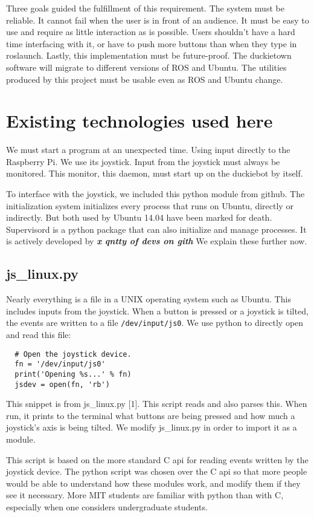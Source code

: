 \documentclass[titlepage]{article}
\begin{document}
Three goals guided the fulfillment of this requirement. The system must be reliable. It cannot fail when the user is in front of an audience. It must be easy to use and require as little interaction as is possible. Users shouldn't have a hard time interfacing with it, or have to push more buttons than when they type in roslaunch.
Lastly, this implementation must be future-proof. The duckietown software will migrate to  different versions of ROS and Ubuntu. The utilities produced by this project must be usable even as ROS and Ubuntu change. 
\section{Existing technologies used here} 
We must start a program at an unexpected time. Using input directly to the Raspberry Pi. We use its joystick. Input from the joystick must always be monitored. This monitor, this daemon, must start up on the duckiebot by itself. 

To interface with the joystick, we included this python module from github. 
The initialization system initializes every process that runs on Ubuntu, directly or indirectly. But both used by Ubuntu 14.04 have been marked for death.
Supervisord is a python package that can also initialize and manage processes. It is actively developed by \textbf{\textit{x qntty of devs on gith}}
We explain these further now. 
\subsection{js\_linux.py}
Nearly everything is a file in a UNIX operating system such as Ubuntu. This includes inputs from the joystick. When a button is pressed or a joystick is tilted, the events are written to a file \texttt{/dev/input/js0}. We use python to directly open and read this file:

\begin{lstlisting}
  # Open the joystick device.
  fn = '/dev/input/js0' 
  print('Opening %s...' % fn)
  jsdev = open(fn, 'rb')
\end{lstlisting}

This snippet is from js\_linux.py [1]. This script reads and also parses this. When run, it prints to the terminal what buttons are being pressed and how much a joystick's axis is being tilted. We modify js\_linux.py in order to import it as a module. 

This script is based on the more standard C api for reading events written by the joystick device. The python script was chosen over the C api so that more people would be able to understand how these modules work, and modify them if they see it necessary. More MIT students are familiar with python than with C, especially when one considers undergraduate students.
\end{document}

